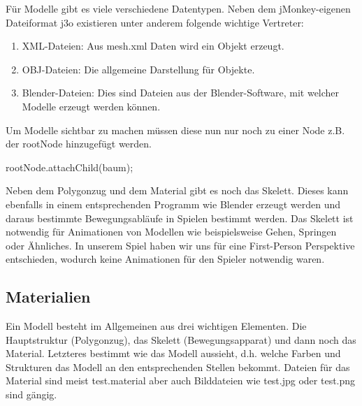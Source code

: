 Für Modelle gibt es viele verschiedene Datentypen. Neben dem jMonkey-eigenen Dateiformat j3o existieren unter anderem folgende wichtige Vertreter:
\begin{enumerate}
	\item XML-Dateien: Aus mesh.xml Daten wird ein Objekt erzeugt. 
	\item OBJ-Dateien: Die allgemeine Darstellung für Objekte.
	\item Blender-Dateien: Dies sind Dateien aus der Blender-Software, mit welcher Modelle erzeugt werden können.
\end{enumerate}

\bigskip
Um Modelle sichtbar zu machen müssen diese nun nur noch zu einer Node z.B. der rootNode hinzugefügt werden. 

\begin{center}
	{rootNode.attachChild(baum);}
\end{center}


Neben dem Polygonzug und dem Material gibt es noch das Skelett. Dieses kann ebenfalls in einem entsprechenden Programm wie Blender erzeugt werden und daraus bestimmte Bewegungsabläufe in Spielen bestimmt werden.
Das Skelett ist notwendig für Animationen von Modellen wie beispielsweise Gehen, Springen oder Ähnliches.
In unserem Spiel haben wir uns für eine First-Person Perspektive entschieden, wodurch keine Animationen für den Spieler notwendig waren.



\subsection{Materialien}
Ein Modell besteht im Allgemeinen aus drei wichtigen Elementen.
Die Hauptstruktur (Polygonzug), das Skelett (Bewegungsapparat) und dann noch das Material.
Letzteres bestimmt wie das Modell aussieht, d.h. welche Farben und Strukturen das Modell an den entsprechenden Stellen bekommt.
Dateien für das Material sind meist test.material aber auch Bilddateien wie test.jpg oder test.png sind gängig.


